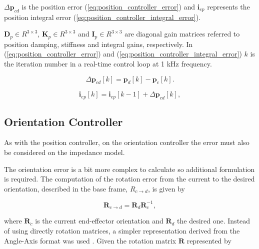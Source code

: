 $\Delta \boldsymbol{p}_{cd}$ is the position error (\ref{eq:position_controller_error}) and $\boldsymbol{i}_{ep}$ represents the position integral error (\ref{eq:position_controller_integral_error}).

$\boldsymbol{D}_p \in R^{3\times3}$, $\boldsymbol{K}_p \in R^{3\times3}$ and $\boldsymbol{I}_p \in R^{3\times3}$ are diagonal gain matrices referred to position damping, stiffness and integral gains, respectively. In (\ref{eq:position_controller_error}) and (\ref{eq:position_controller_integral_error}) $k$ is the iteration number in a real-time control loop at 1 kHz frequency.

\begin{equation}
    \label{eq:position_controller_error}
    \Delta \boldsymbol{p}_{cd}[k] = \boldsymbol{p}_d[k] - \boldsymbol{p}_c[k].
\end{equation}

\begin{equation}
    \label{eq:position_controller_integral_error}
    \boldsymbol{i}_{ep}[k] = \boldsymbol{i}_{ep}[k-1] + \Delta \boldsymbol{p}_{cd}[k],
\end{equation}


\subsection{Orientation Controller}
\label{subsec:control_architectures_cartesian_impedance_posture_optimisation_orientation_controller}

As with the position controller, on the orientation controller the error must also be considered on the impedance model.

The orientation error is a bit more complex to calculate so additional formulation is required. The computation of the rotation error from the current to the desired orientation, described in the base frame, $R_{c\to d}$, is given by \cite{Ochoa2019_control_architecture_robotic_polishing}

\begin{equation}
    \label{eq:orientation_controller_error}
    \boldsymbol{R}_{c\to d} = \boldsymbol{R}_d \boldsymbol{R}^{-1}_c,
\end{equation}

where $\boldsymbol{R}_c$ is the current end-effector orientation and $\boldsymbol{R}_d$ the desired one. Instead of using directly rotation matrices, a simpler representation derived from the Angle-Axis format was used \cite{Ochoa2019_control_architecture_robotic_polishing}. Given the rotation matrix $\boldsymbol{R}$ represented by

